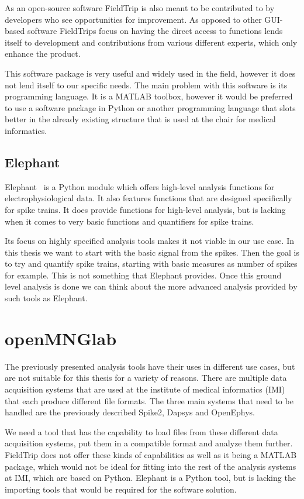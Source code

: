 As an open-source software FieldTrip is also meant to be contributed to by developers who see opportunities for improvement. As opposed to other GUI-based software FieldTrips focus on having the direct access to functions lends itself to development and contributions from various different experts, which only enhance the product.

This software package is very useful and widely used in the field, however it does not lend itself to our specific needs.
The main problem with this software is its programming language. It is a MATLAB toolbox, however it would be preferred to use a software package in Python or another programming language that slots better in the already existing structure that is used at the chair for medical informatics.  

\subsection{Elephant}
Elephant~\cite{elephant18} is a Python module which offers high-level analysis functions for electrophysiological data.
It also features functions that are designed specifically for spike trains. It does provide functions for high-level analysis, but is lacking when it comes to very basic functions and quantifiers for spike trains. 

Its focus on highly specified analysis tools makes it not viable in our use case. In this thesis we want to start with the basic signal from the spikes. Then the goal is to try and quantify spike trains, starting with basic measures as number of spikes for example. This is not something that Elephant provides. Once this ground level analysis is done we can think about the more advanced analysis provided by such tools as Elephant.

\section{openMNGlab}
The previously presented analysis tools have their uses in different use cases, but are not suitable for this thesis for a variety of reasons.
There are multiple data acquisition systems that are used at the institute of medical informatics (IMI) that each produce different file formats. The three main systems that need to be handled are the previously described Spike2, Dapsys and OpenEphys.
 
We need a tool that has the capability to load files from these different data acquisition systems, put them in a compatible format and analyze them further.  FieldTrip does not offer these kinds of capabilities as well as it being a MATLAB package, which would not be ideal for fitting into the rest of the analysis systems at IMI, which are based on Python. Elephant is a Python tool, but is lacking the importing tools that would be required for the software solution. 

